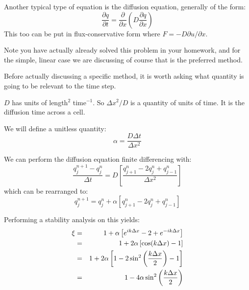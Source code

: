Another typical type of equation is the diffusion equation, generally
of the form:
\begin{equation}
\frac{\partial q}{\partial t} = \frac{\partial}{\partial
x} \left(D \frac{\partial q}{\partial x}\right)
\end{equation}
This too can be put in flux-conservative form where $F = -D \partial
u/\partial x$. 

Note you have actually already solved this problem in your homework,
and for the simple, linear case we are discussing of course that is
the preferred method.

Before actually discussing a specific method, it is worth asking what
quantity is going to be relevant to the time step.


\begin{answer}
$D$ has units of length$^2$ time$^{-1}$. So $\Delta x^2 / D$ is a
quantity of units of time. It is the diffusion time across a cell. 
\end{answer}

We will define a unitless quantity:
\begin{equation}
\alpha = \frac{D \Delta t}{\Delta x^2}
\end{equation}

We can perform the diffusion equation finite differencing with:
\begin{equation}
\frac{q_j^{n+1} - q_j^{n}}{\Delta t} = D \left[\frac{q_{j+1}^n - 2
q_j^n + q_{j-1}^n}{\Delta x^2}\right]
\end{equation}
which can be rearranged to:
\begin{equation}
q_j^{n+1} = q_j^{n} + \alpha \left[q_{j+1}^n - 2
q_j^n + q_{j-1}^n\right]
\end{equation}

Performing a stability analysis on this yields:
\begin{eqnarray}
\xi &=& 1 + \alpha \left[e^{ik\Delta x} - 2 + e^{-ik \Delta
x}\right] \cr
&=& 1 + 2 \alpha \left[\cos(k\Delta x) - 1 \right] \cr
&=& 1 + 2 \alpha \left[1 - 2\sin^2\left(\frac{k\Delta x}{2}\right) - 1 \right] \cr
&=& 1 - 4 \alpha \sin^2\left(\frac{k\Delta x}{2}\right) 
\end{eqnarray}


